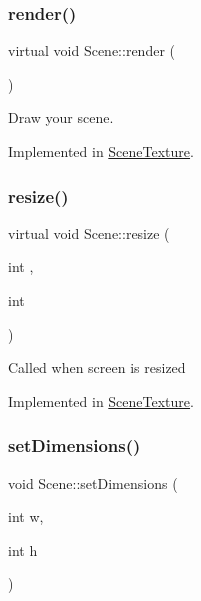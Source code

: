 \mbox{\label{class_scene_a823f4cd60d27932ee16f74adb0421ff6}} 
\subsubsection{\texorpdfstring{render()}{render()}}
{\footnotesize\ttfamily virtual void Scene\+::render (\begin{DoxyParamCaption}{ }\end{DoxyParamCaption})\hspace{0.3cm}{\ttfamily [pure virtual]}}

Draw your scene. 

Implemented in \mbox{\hyperlink{class_scene_texture_ab988e3452c65e9b999a80764905159c4}{Scene\+Texture}}.

\mbox{\label{class_scene_a454bd0a09c125201fbb32e15d4f62fa3}} 
\subsubsection{\texorpdfstring{resize()}{resize()}}
{\footnotesize\ttfamily virtual void Scene\+::resize (\begin{DoxyParamCaption}\item[{int}]{,  }\item[{int}]{ }\end{DoxyParamCaption})\hspace{0.3cm}{\ttfamily [pure virtual]}}

Called when screen is resized 

Implemented in \mbox{\hyperlink{class_scene_texture_a25d792c7e4f5eba8f9c04b28077c6804}{Scene\+Texture}}.

\mbox{\label{class_scene_a30001708297b0c60e30ae7c43acfb037}} 
\subsubsection{\texorpdfstring{setDimensions()}{setDimensions()}}
{\footnotesize\ttfamily void Scene\+::set\+Dimensions (\begin{DoxyParamCaption}\item[{int}]{w,  }\item[{int}]{h }\end{DoxyParamCaption})\hspace{0.3cm}{\ttfamily [inline]}}

